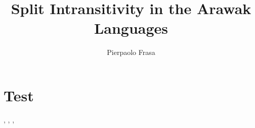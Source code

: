 \documentclass[a4paper]{scrreprt}
\author{Pierpaolo Frasa}
\title{Split Intransitivity in the Arawak Languages}
\begin{document}


\setcounter{page}{1}
\tableofcontents


\chapter{Test}
\citet{arkadiev08}, \citet{donohue08}, \citet[32]{malchukov08}, \citep{mithun91}


\end{document}
